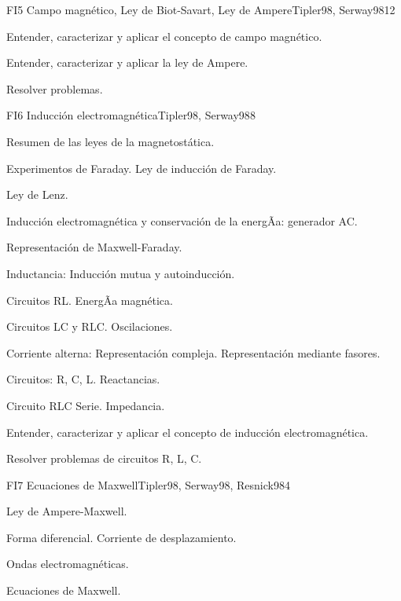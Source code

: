 \begin{syllabus}
\begin{unit}{FI5 Campo magnético, Ley de Biot-Savart, Ley de Ampere}{Tipler98, Serway98}{12}
   \begin{unitgoals}
         \item  Entender, caracterizar y aplicar el concepto de campo magnético.
         \item  Entender, caracterizar y aplicar la ley de Ampere.
         \item  Resolver problemas.
   \end{unitgoals}
\end{unit}

\begin{unit}{FI6 Inducción electromagnética}{Tipler98, Serway98}{8}
   \begin{topics}
         \item  Resumen de las leyes de la magnetostática.
	 \item  Experimentos de Faraday.  Ley de inducción de Faraday.
         \item  Ley de Lenz.
	 \item  Inducción electromagnética y conservación de la energÃ­a: generador AC.
         \item  Representación de Maxwell-Faraday.
         \item  Inductancia: Inducción mutua y autoinducción.
         \item  Circuitos RL.  EnergÃ­a magnética.
         \item  Circuitos LC y RLC. Oscilaciones.
         \item  Corriente alterna: Representación compleja. Representación mediante fasores.
	 \item  Circuitos: R, C, L. Reactancias.
         \item  Circuito RLC Serie.  Impedancia.
   \end{topics}

   \begin{unitgoals}
         \item  Entender, caracterizar y aplicar el concepto de inducción electromagnética.
         \item  Resolver problemas de circuitos R, L, C.
   \end{unitgoals}
\end{unit}

\begin{unit}{FI7 Ecuaciones de Maxwell}{Tipler98, Serway98, Resnick98}{4}
   \begin{topics}
         \item  Ley de Ampere-Maxwell.
	 \item  Forma diferencial. Corriente de desplazamiento.
         \item  Ondas electromagnéticas.
	 \item  Ecuaciones de Maxwell.
   \end{topics}


\end{unit}
\end{syllabus}
